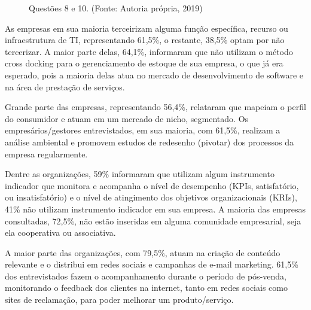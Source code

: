 \begin{figure}[H]
\center
{}
\qquad
{}
\caption{Questões 8 e 10. (Fonte: Autoria própria, 2019)}
\label{fig:tempodemercado}
\end{figure}

As empresas em sua maioria terceirizam alguma função específica, recurso ou infraestrutura de TI, representando 61,5\%, o restante, 38,5\% optam por não tercerizar. A maior parte delas, 64,1\%, informaram que não utilizam o método cross docking para o gerenciamento de estoque de sua empresa, o que já era esperado, pois a maioria delas atua no mercado de desenvolvimento de software e na área de prestação de serviços.

Grande parte das empresas, representando 56,4\%, relataram que mapeiam o perfil do consumidor e atuam em um mercado de nicho, segmentado. Os empresários/gestores entrevistados, em sua maioria, com 61,5\%, realizam a análise ambiental e promovem estudos de redesenho (pivotar) dos processos da empresa regularmente.

Dentre as organizações, 59\% informaram que utilizam algum instrumento indicador que monitora e acompanha o nível de desempenho (KPIs, satisfatório, ou insatisfatório) e o nível de atingimento dos objetivos organizacionais (KRIs), 41\% não utilizam instrumento indicador em sua empresa. A maioria das empresas consultadas, 72,5\%, não estão inseridas em alguma comunidade empresarial, seja ela cooperativa ou associativa.

A maior parte das organizações, com 79,5\%, atuam na criação de conteúdo relevante e o distribui em redes sociais e campanhas de e-mail marketing. 61,5\% dos entrevistados fazem o acompanhamento durante o período de pós-venda, monitorando o feedback dos clientes na internet, tanto em redes sociais como sites de reclamação, para poder melhorar um produto/serviço.

